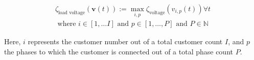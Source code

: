 \begin{equation}
\begin{split}
	\zeta_\text{load voltage}(\textbf{v}(t)) := \max_{i,p}{\zeta_\text{voltage}(v_{i,p}(t))} \forall t \\
	\text{ where } i \in [1, \dots I] \text{ and } p \in [1, \dots, P] \text{ and } P \in \mathbb{N}
\end{split}
\label{ch1:equ:load-voltage-deviation}
\end{equation}

Here, $i$ represents the customer number out of a total customer count $I$, and $p$ the phases to which the customer is connected out of a total phase count $P$.